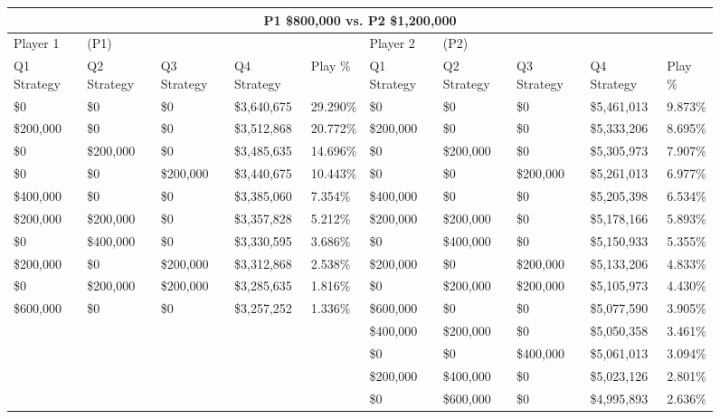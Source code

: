 \documentclass[11pt]{article}
\begin{document}
\begin{figure}
\tiny
\begin{tabular}{ |p{1.0cm}p{1.0cm}p{1.0cm}p{2.0cm}|p{1.0cm}||p{1.0cm}p{1.0cm}p{1.0cm}p{2.0cm}|p{1.0cm}|}
\hline
\multicolumn{10}{|c|}{P1 \$800,000 vs. P2 \$1,200,000} \\
\hline
Player 1 & (P1) & & & & Player 2 & (P2) & & & \\
\hline
Q1 Strategy & Q2 Strategy & Q3 Strategy & Q4 Strategy  &  Play \% & Q1 Strategy & Q2 Strategy & Q3 Strategy & Q4 Strategy  &  Play \%\\
\hline
\$0 & \$0 & \$0 & \$3,640,675  & 29.290\%           & \$0 & \$0 & \$0 & \$5,461,013  & 9.873\% \\
\$200,000 & \$0 & \$0 & \$3,512,868  & 20.772\%     & \$200,000 & \$0 & \$0 & \$5,333,206  & 8.695\% \\
\$0& \$200,000 & \$0 & \$3,485,635  & 14.696\%      & \$0& \$200,000 & \$0 & \$5,305,973  & 7.907\% \\
\$0 & \$0& \$200,000 & \$3,440,675  & 10.443\%      & \$0 & \$0& \$200,000 & \$5,261,013  & 6.977\% \\
\$400,000 & \$0 & \$0 & \$3,385,060  & 7.354\%      & \$400,000 & \$0 & \$0 & \$5,205,398  & 6.534\% \\
\$200,000& \$200,000 & \$0 & \$3,357,828  & 5.212\% & \$200,000& \$200,000 & \$0 & \$5,178,166  & 5.893\% \\
\$0& \$400,000 & \$0 & \$3,330,595  & 3.686\%       & \$0& \$400,000 & \$0 & \$5,150,933  & 5.355\% \\
\$200,000 & \$0& \$200,000 & \$3,312,868  & 2.538\% & \$200,000 & \$0& \$200,000 & \$5,133,206  & 4.833\% \\
\$0& \$200,000& \$200,000 & \$3,285,635  & 1.816\%  & \$0& \$200,000& \$200,000 & \$5,105,973  & 4.430\% \\
\$600,000 & \$0 & \$0 & \$3,257,252  & 1.336\%      & \$600,000 & \$0 & \$0 & \$5,077,590  & 3.905\% \\
&&&&                                                & \$400,000& \$200,000 & \$0 & \$5,050,358  & 3.461\% \\
&&&&                                                & \$0 & \$0& \$400,000 & \$5,061,013  & 3.094\% \\
&&&&                                                & \$200,000& \$400,000 & \$0 & \$5,023,126  & 2.801\% \\
&&&&                                                & \$0 & \$600,000 & \$0 & \$4,995,893  & 2.636\% \\

\end{tabular}
\end{figure}
\end{document}
